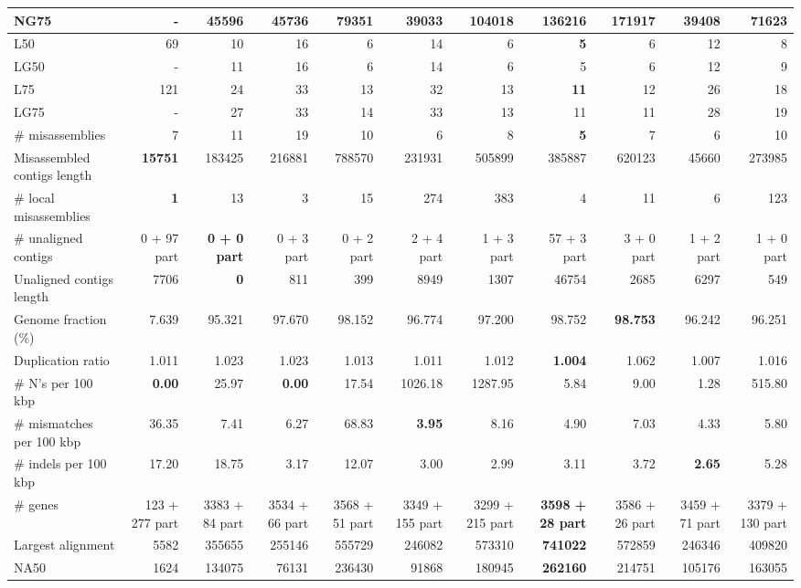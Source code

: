 \documentclass[12pt,a4paper]{article}
\begin{document}
\begin{table}[ht]
\begin{center}
\begin{tabular}{|l*{10}{|r}|}
NG75 & - & 45596 & 45736 & 79351 & 39033 & 104018 & 136216 & 171917 & 39408 & 71623 \\ \hline
L50 & 69 & 10 & 16 & 6 & 14 & 6 & {\bf 5} & 6 & 12 & 8 \\ \hline
LG50 & - & 11 & 16 & 6 & 14 & 6 & 5 & 6 & 12 & 9 \\ \hline
L75 & 121 & 24 & 33 & 13 & 32 & 13 & {\bf 11} & 12 & 26 & 18 \\ \hline
LG75 & - & 27 & 33 & 14 & 33 & 13 & 11 & 11 & 28 & 19 \\ \hline
\# misassemblies & 7 & 11 & 19 & 10 & 6 & 8 & {\bf 5} & 7 & 6 & 10 \\ \hline
Misassembled contigs length & {\bf 15751} & 183425 & 216881 & 788570 & 231931 & 505899 & 385887 & 620123 & 45660 & 273985 \\ \hline
\# local misassemblies & {\bf 1} & 13 & 3 & 15 & 274 & 383 & 4 & 11 & 6 & 123 \\ \hline
\# unaligned contigs & 0 + 97 part & {\bf 0 + 0 part} & 0 + 3 part & 0 + 2 part & 2 + 4 part & 1 + 3 part & 57 + 3 part & 3 + 0 part & 1 + 2 part & 1 + 0 part \\ \hline
Unaligned contigs length & 7706 & {\bf 0} & 811 & 399 & 8949 & 1307 & 46754 & 2685 & 6297 & 549 \\ \hline
Genome fraction (\%) & 7.639 & 95.321 & 97.670 & 98.152 & 96.774 & 97.200 & 98.752 & {\bf 98.753} & 96.242 & 96.251 \\ \hline
Duplication ratio & 1.011 & 1.023 & 1.023 & 1.013 & 1.011 & 1.012 & {\bf 1.004} & 1.062 & 1.007 & 1.016 \\ \hline
\# N's per 100 kbp & {\bf 0.00} & 25.97 & {\bf 0.00} & 17.54 & 1026.18 & 1287.95 & 5.84 & 9.00 & 1.28 & 515.80 \\ \hline
\# mismatches per 100 kbp & 36.35 & 7.41 & 6.27 & 68.83 & {\bf 3.95} & 8.16 & 4.90 & 7.03 & 4.33 & 5.80 \\ \hline
\# indels per 100 kbp & 17.20 & 18.75 & 3.17 & 12.07 & 3.00 & 2.99 & 3.11 & 3.72 & {\bf 2.65} & 5.28 \\ \hline
\# genes & 123 + 277 part & 3383 + 84 part & 3534 + 66 part & 3568 + 51 part & 3349 + 155 part & 3299 + 215 part & {\bf 3598 + 28 part} & 3586 + 26 part & 3459 + 71 part & 3379 + 130 part \\ \hline
Largest alignment & 5582 & 355655 & 255146 & 555729 & 246082 & 573310 & {\bf 741022} & 572859 & 246346 & 409820 \\ \hline
NA50 & 1624 & 134075 & 76131 & 236430 & 91868 & 180945 & {\bf 262160} & 214751 & 105176 & 163055 \\ \hline

\end{tabular}
\end{center}
\end{table}
\end{document}
